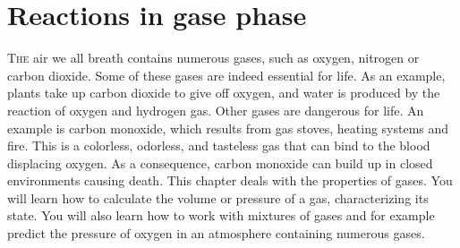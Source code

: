 \documentclass[main.tex]{subfiles}
\begin{document}
\linenumbers


\chapter[Gases ]{Reactions in gase phase}

\begin{marginfigure}
\end{marginfigure}


\lettrine[lines=4]{\color{black!45}T}{he} air we all breath contains numerous gases, such as oxygen, nitrogen or carbon dioxide. Some of these gases are indeed essential for life. As an example, plants take up carbon dioxide to give off oxygen, and water is produced by the reaction of oxygen and hydrogen gas. Other gases are dangerous for life. An example is carbon monoxide, which results from gas stoves, heating systems and fire. This is a colorless, odorless, and tasteless gas that can bind to the blood displacing oxygen. As a consequence, carbon monoxide can build up in closed environments causing death. This chapter deals with the properties of gases. You will learn how to calculate the volume or pressure of a gas, characterizing its state. You will also learn how to work with mixtures of gases and for example predict the pressure of oxygen in an atmosphere containing numerous gases.
\end{document}
